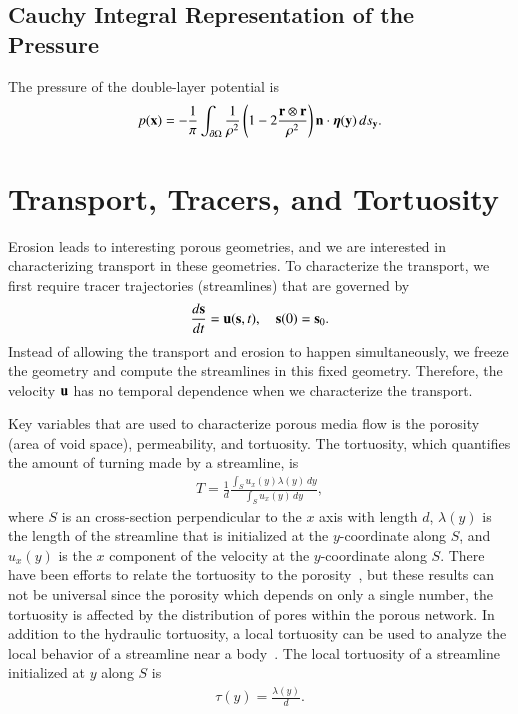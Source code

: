 \documentclass[preprint, 10pt]{elsarticle}
\begin{document}
\subsection{Cauchy Integral Representation of the Pressure}
The pressure of the double-layer potential is
\begin{align}
  p({\mathbf{x}}) = -\frac{1}{\pi} \int_{{\partial}\Omega} \frac{1}{\rho^2}
    \left(1 - 2 \frac{{\mathbf{r}} \otimes {\mathbf{r}}}{\rho^2} \right) {\mathbf{n}}
    \cdot {\boldsymbol\eta}({\mathbf{y}}) \, ds_{\mathbf{y}}.
\end{align}




\section{Transport, Tracers, and Tortuosity}
Erosion leads to interesting porous geometries, and we are interested in
characterizing transport in these geometries.  To characterize the
transport, we first require tracer trajectories (streamlines) that are
governed by
\begin{align}
  \label{eqn:trajectories}
  \frac{d{\mathbf{s}}}{dt} = {\mathbf{u}}({\mathbf{s}},t), \quad {\mathbf{s}}(0) = {\mathbf{s}}_0.
\end{align}
Instead of allowing the transport and erosion to happen simultaneously,
we freeze the geometry and compute the streamlines in this fixed
geometry.  Therefore, the velocity ${\mathbf{u}}$ has no temporal dependence when
we characterize the transport.

Key variables that are used to characterize porous media flow is the
porosity (area of void space), permeability, and tortuosity.  The
tortuosity, which  quantifies the amount of turning made by a
streamline, is
\begin{align*}
  T = \frac{1}{d}\frac{\displaystyle\int_{S}u_x(y)\lambda(y)\,dy}
  {\displaystyle\int_{S}u_x(y)\,dy},
\end{align*}
where $S$ is an cross-section perpendicular to the $x$ axis with length
$d$, $\lambda(y)$ is the length of the streamline that is initialized
at the $y$-coordinate along $S$, and $u_x(y)$ is the $x$ component of
the velocity at the $y$-coordinate along $S$.  There have been efforts
to relate the tortuosity to the porosity~\cite{matyka2008tortuosity},
but these results can not be universal since the porosity which depends
on only a single number, the tortuosity is affected by the distribution
of pores within the porous network.  In addition to the hydraulic
tortuosity, a local tortuosity can be used to analyze the local behavior
of a streamline near a body~\cite{matyka2008tortuosity}.  The local
tortuosity of a streamline initialized at $y$ along $S$ is
\begin{align*}
  \tau(y) = \frac{\lambda(y)}{d}.
\end{align*}
\end{document}
